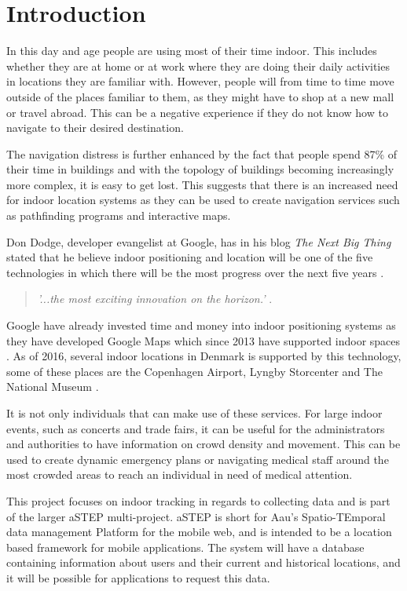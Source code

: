 \chapter{Introduction}
In this day and age people are using most of their time indoor. This includes whether they are at home or at work where they are doing their daily activities in locations they are familiar with. However, people will from time to time move outside of the places familiar to them, as they might have to shop at a new mall or travel abroad. This can be a negative experience if they do not know how to navigate to their desired destination.

The navigation distress is further enhanced by the fact that people spend 87\% of their time in buildings \cite{klepeis2001national} and with the topology of buildings becoming increasingly more complex, it is easy to get lost. This suggests that there is an increased need for indoor location systems as they can be used to create navigation services such as pathfinding programs and interactive maps. %

Don Dodge, developer evangelist at Google, has in his blog \textit{The Next Big Thing} stated that he believe indoor positioning and location will be one of the five technologies in which there will be the most progress over the next five years \cite{DonDIndoorIsNext}.
\begin{quotation}
	\textit{'...the most exciting innovation on the horizon.'} \cite{DonDNextBigThing}.
\end{quotation}
Google have already invested time and money into indoor positioning systems as they have developed Google Maps which since 2013 have supported indoor spaces \cite{google_indoor}. As of 2016, several indoor locations in Denmark is supported by this technology, some of these places are the Copenhagen Airport, Lyngby Storcenter and The National Museum \cite{google_dk}.

It is not only individuals that can make use of these services. For large indoor events, such as concerts and trade fairs, it can be useful for the administrators and authorities to have information on crowd density and movement. This can be used to create dynamic emergency plans or navigating medical staff around the most crowded areas to reach an individual in need of medical attention.

This project focuses on indoor tracking in regards to collecting data and is part of the larger aSTEP multi-project. aSTEP is short for Aau's Spatio-TEmporal data management Platform for the mobile web, and is intended to be a location based framework for mobile applications. The system will have a database containing information about users and their current and historical locations, and it will be possible for applications to request this data.

